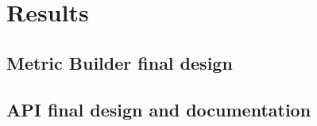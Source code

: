 \chapter{Results}

\section{Metric Builder final design}

\section{API final design and documentation}